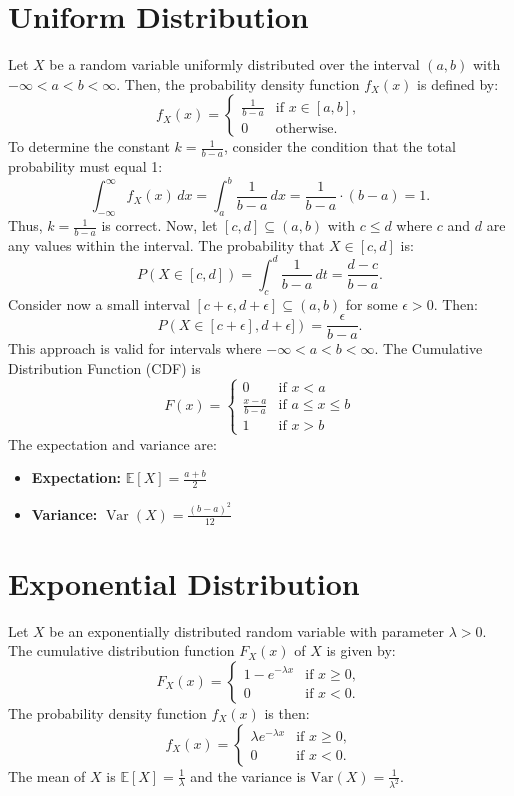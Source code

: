 \section{Uniform Distribution}
Let \( X \) be a random variable uniformly distributed over the interval \( (a, b) \) with \( -\infty < a < b < \infty \). Then, the probability density function \( f_X(x) \) is defined by:
\[
f_X(x) = 
\begin{cases} 
\frac{1}{b - a} & \text{if } x \in [a, b], \\
0 & \text{otherwise}.
\end{cases}
\]
To determine the constant \( k = \frac{1}{b - a} \), consider the condition that the total probability must equal 1:
\[
\int_{-\infty}^{\infty} f_X(x) \, dx = \int_a^b \frac{1}{b - a} \, dx = \frac{1}{b - a} \cdot (b - a) = 1.
\]
Thus, \( k = \frac{1}{b - a} \) is correct. \newline
Now, let \( [c, d] \subseteq (a, b) \) with \( c \leq d \) where \( c \) and \( d \) are any values within the interval. The probability that \( X \in [c, d] \) is:
\[
P(X \in [c, d]) = \int_c^d \frac{1}{b - a} \, dt = \frac{d - c}{b - a}.
\]
Consider now a small interval \( [c + \epsilon, d + \epsilon] \subseteq (a,b) \) for some \( \epsilon > 0 \). Then:
\[
P(X \in [c + \epsilon], d + \epsilon]) = \frac{\epsilon}{b - a}.
\]
This approach is valid for intervals where \( -\infty < a < b < \infty \). \newline
The Cumulative Distribution Function (CDF) is
\[
F(x) = 
\begin{cases} 
0 & \text{if } x < a \\ 
\frac{x - a}{b - a} & \text{if } a \le x \le b \\ 
1 & \text{if } x > b 
\end{cases}
\]
The expectation and variance are:
\begin{itemize}
    \item \textbf{Expectation:} \( \mathbb{E}[X] = \frac{a + b}{2} \)\\
    \item \textbf{Variance:} \( \operatorname{Var}(X) = \frac{(b - a)^2}{12} \)
\end{itemize}

\section{Exponential Distribution}
Let \( X \) be an exponentially distributed random variable with parameter \( \lambda > 0 \). The cumulative distribution function \( F_X(x) \) of \( X \) is given by:
\[
F_X(x) = 
\begin{cases} 
1 - e^{-\lambda x} & \text{if } x \geq 0, \\
0 & \text{if } x < 0.
\end{cases}
\]
The probability density function \( f_X(x) \) is then:
\[
f_X(x) = 
\begin{cases} 
\lambda e^{-\lambda x} & \text{if } x \geq 0, \\
0 & \text{if } x < 0.
\end{cases}
\]
The mean of \( X \) is \( \mathbb{E}[X] = \frac{1}{\lambda} \) and the variance is \( \text{Var}(X) = \frac{1}{\lambda^2} \).

